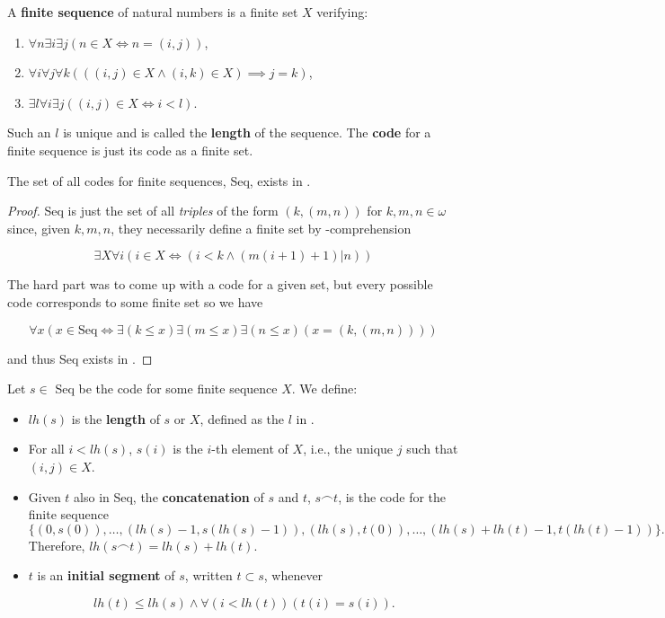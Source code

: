 \documentclass[../main.tex]{memoir}
\begin{document}
\begin{definition}
  \label{def:finite-sequence}
  A \textbf{finite sequence} of natural numbers is a finite set $X$ verifying:

  \begin{enumerate}
  \item $\forall n \exists i \exists j (n \in X \iff n = (i, j))$,
  \item $\forall i \forall j \forall k (((i, j) \in X \land (i, k) \in X) \implies j = k)$,
  \item $\exists l \forall i \exists j ((i, j) \in X \iff i < l)$.
  \end{enumerate}

  Such an $l$ is unique and is called the \textbf{length} of the sequence. The \textbf{code} for a finite sequence is just its code as a finite set.
\end{definition}

\begin{theorem}
  The set of all codes for finite sequences, Seq, exists in \rca.
\end{theorem}
\begin{proof}
  Seq is just the set of all \textit{triples} of the form $(k, (m, n))$ for $k, m, n \in \omega$ since, given $k, m, n$, they necessarily define a finite set by \rec-comprehension

  \[ \exists X \forall i (i \in X \iff (i < k \land (m(i + 1) + 1) \vert n)) \]

  The hard part was to come up with a code for a given set, but every possible code corresponds to some finite set so we have

  \[ \forall x (x \in \text{Seq} \iff \exists (k \le x) \exists (m \le x) \exists (n \le x) (x = (k, (m, n)))) \]

  and thus Seq exists in \rca.
\end{proof}

\begin{definition}
  Let $s \in$ Seq be the code for some finite sequence $X$. We define:

  \begin{itemize}
  \item $lh(s)$ is the \textbf{length} of $s$ or $X$, defined as the $l$ in .
  \item For all $i < lh(s)$, $s(i)$ is the $i$-th element of $X$, i.e., the unique $j$ such that $(i, j) \in X$.
  \item Given $t$ also in Seq, the \textbf{concatenation} of $s$ and $t$, $s \frown t$, is the code for the finite sequence
    \[ \{(0, s(0)), \ldots, (lh(s) - 1, s(lh(s) - 1)),
      (lh(s), t(0)), \ldots, (lh(s) + lh(t) - 1, t(lh(t) - 1))\}. \]
    Therefore, $lh(s \frown t) = lh(s) + lh(t)$.
  \item $t$ is an \textbf{initial segment} of $s$, written $t \subset s$, whenever

    \[ lh(t) \le lh(s) \land \forall (i < lh(t)) (t(i) = s(i)). \]
  \end{itemize}
\end{definition}
\end{document}
